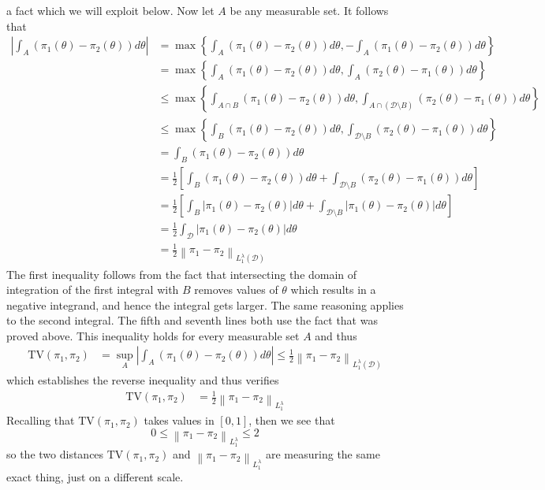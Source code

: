 \documentclass[12pt]{article}
\newcommand*{\norm}[1]{\left\lVert#1\right\rVert}
\newcommand*{\abs}[1]{\left\lvert#1\right\rvert}
\begin{document}
a fact which we will exploit below. Now let $A$ be any measurable set. It follows that 
\begin{align*}
\abs{\int_A \left(\pi_1(\theta) - \pi_2(\theta)\right) d\theta} &= \max\left\{\int_A \left(\pi_1(\theta) - \pi_2(\theta)\right) d\theta, -\int_A \left(\pi_1(\theta) - \pi_2(\theta)\right) d\theta \right\} \\
										      &=  \max\left\{\int_A \left(\pi_1(\theta) - \pi_2(\theta)\right) d\theta, \int_A \left(\pi_2(\theta) - \pi_1(\theta)\right) d\theta \right\} \\
										      &\leq \max\left\{\int_{A \cap B} \left(\pi_1(\theta) - \pi_2(\theta)\right) d\theta, \int_{A \cap (\mathcal{D} \setminus B)} \left(\pi_2(\theta) - \pi_1(\theta)\right) d\theta \right\} \\
										      &\leq \max\left\{\int_{B} \left(\pi_1(\theta) - \pi_2(\theta)\right) d\theta, \int_{\mathcal{D} \setminus B} \left(\pi_2(\theta) - \pi_1(\theta)\right) d\theta \right\} \\
										      &= \int_{B} \left(\pi_1(\theta) - \pi_2(\theta)\right) d\theta \\
										      &= \frac{1}{2} \left[\int_{B} \left(\pi_1(\theta) - \pi_2(\theta)\right) d\theta + \int_{\mathcal{D} \setminus B} \left(\pi_2(\theta) - \pi_1(\theta) \right) d\theta \right] \\
										      &= \frac{1}{2} \left[\int_{B} \abs{\pi_1(\theta) - \pi_2(\theta)} d\theta + \int_{\mathcal{D} \setminus B} \abs{\pi_1(\theta) - \pi_2(\theta)} d\theta \right] \\
										      &= \frac{1}{2} \int_{\mathcal{D}} \abs{\pi_1(\theta) - \pi_2(\theta)} d\theta \\
										      &= \frac{1}{2} \norm{\pi_1 - \pi_2}_{L_1^{\lambda}(\mathcal{D})}
\end{align*}
The first inequality follows from the fact that intersecting the domain of integration of the first integral with $B$ removes values of $\theta$ which results in a negative integrand, and hence the 
integral gets larger. The same reasoning applies to the second integral. The fifth and seventh lines both use the fact that was proved above. This inequality holds for every measurable set $A$ and thus 
\begin{align*}
\text{TV}(\pi_1, \pi_2) &= \sup_A \abs{\int_A \left(\pi_1(\theta) - \pi_2(\theta)\right) d\theta} \leq \frac{1}{2} \norm{\pi_1 - \pi_2}_{L_1^{\lambda}(\mathcal{D})}
\end{align*}
which establishes the reverse inequality and thus verifies 
\begin{align*}
\text{TV}(\pi_1, \pi_2) &= \frac{1}{2} \norm{\pi_1 - \pi_2}_{L_1^\lambda}
\end{align*}
Recalling that $\text{TV}(\pi_1, \pi_2)$ takes values in $[0, 1]$, then we see that 
\[0 \leq \norm{\pi_1 - \pi_2}_{L_1^\lambda} \leq 2\]
so the two distances $\text{TV}(\pi_1, \pi_2)$ and $\norm{\pi_1 - \pi_2}_{L_1^\lambda}$ are measuring the same exact thing, just on a different scale. 
\end{document}
